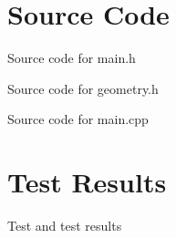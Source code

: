 \documentclass[12pt]{article}
\begin{document}
\maketitle
\pagebreak


\section{Source Code}

Source code for \textsf{main.h}


Source code for \textsf{geometry.h}


Source code for \textsf{main.cpp}


\newpage











\section{Test Results}

Test and test results

\end{document}
